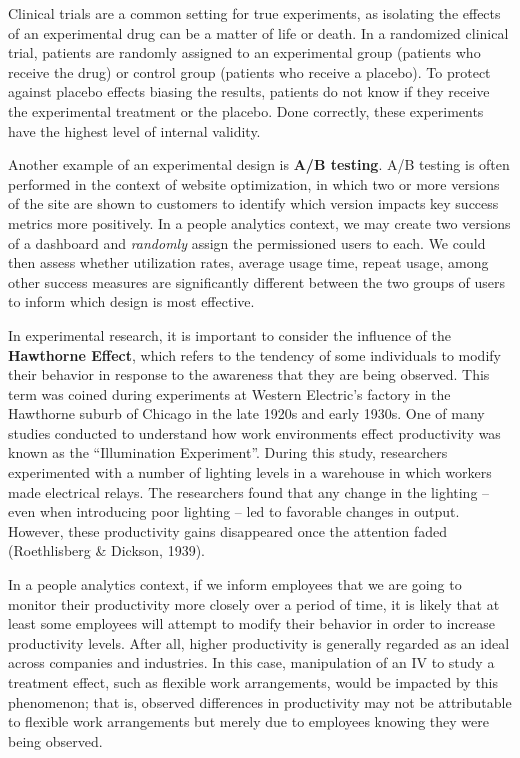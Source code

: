 \documentclass[]{book}
\begin{document}
Clinical trials are a common setting for true experiments, as isolating the effects of an experimental drug can be a matter of life or death. In a randomized clinical trial, patients are randomly assigned to an experimental group (patients who receive the drug) or control group (patients who receive a placebo). To protect against placebo effects biasing the results, patients do not know if they receive the experimental treatment or the placebo. Done correctly, these experiments have the highest level of internal validity.

Another example of an experimental design is \textbf{A/B testing}. A/B testing is often performed in the context of website optimization, in which two or more versions of the site are shown to customers to identify which version impacts key success metrics more positively. In a people analytics context, we may create two versions of a dashboard and \emph{randomly} assign the permissioned users to each. We could then assess whether utilization rates, average usage time, repeat usage, among other success measures are significantly different between the two groups of users to inform which design is most effective.

In experimental research, it is important to consider the influence of the \textbf{Hawthorne Effect}, which refers to the tendency of some individuals to modify their behavior in response to the awareness that they are being observed. This term was coined during experiments at Western Electric's factory in the Hawthorne suburb of Chicago in the late 1920s and early 1930s. One of many studies conducted to understand how work environments effect productivity was known as the ``Illumination Experiment''. During this study, researchers experimented with a number of lighting levels in a warehouse in which workers made electrical relays. The researchers found that any change in the lighting -- even when introducing poor lighting -- led to favorable changes in output. However, these productivity gains disappeared once the attention faded (Roethlisberg \& Dickson, 1939).

In a people analytics context, if we inform employees that we are going to monitor their productivity more closely over a period of time, it is likely that at least some employees will attempt to modify their behavior in order to increase productivity levels. After all, higher productivity is generally regarded as an ideal across companies and industries. In this case, manipulation of an IV to study a treatment effect, such as flexible work arrangements, would be impacted by this phenomenon; that is, observed differences in productivity may not be attributable to flexible work arrangements but merely due to employees knowing they were being observed.
\end{document}
